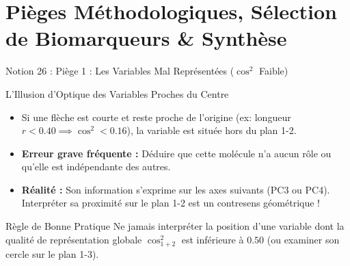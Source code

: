 \documentclass[aspectratio=169,10pt]{beamer}
\begin{document}
\section{Pièges Méthodologiques, Sélection de Biomarqueurs \& Synthèse}

\begin{frame}{Notion 26 : Piège 1 : Les Variables Mal Représentées ($\cos^2$ Faible)}
  \begin{warnbox}{L'Illusion d'Optique des Variables Proches du Centre}
    \footnotesize
    \begin{itemize}
      \item Si une flèche est courte et reste proche de l'origine (ex: longueur $r < 0.40 \implies \cos^2 < 0.16$), la variable est située hors du plan 1-2.
      \item \textbf{Erreur grave fréquente :} Déduire que cette molécule n'a aucun rôle ou qu'elle est indépendante des autres.
      \item \textbf{Réalité :} Son information s'exprime sur les axes suivants (PC3 ou PC4). Interpréter sa proximité sur le plan 1-2 est un contresens géométrique !
    \end{itemize}
  \end{warnbox}
  \vspace{1mm}
  \begin{takeawaybox}{Règle de Bonne Pratique}
    \footnotesize
    Ne jamais interpréter la position d'une variable dont la qualité de représentation globale $\cos^2_{1+2}$ est inférieure à $0.50$ (ou examiner son cercle sur le plan 1-3).
  \end{takeawaybox}
\end{frame}
\end{document}
